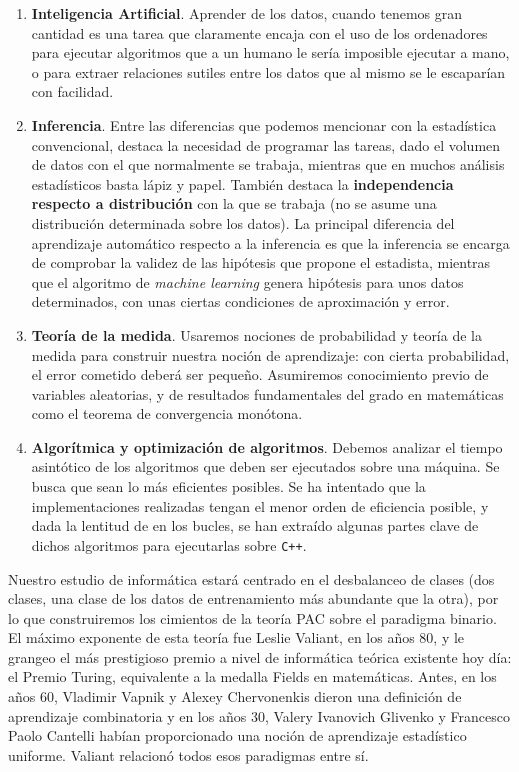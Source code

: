 \begin{enumerate}[i]
\item \textbf{Inteligencia Artificial}. Aprender de los datos, cuando tenemos gran cantidad es una tarea que 
claramente encaja con el uso de los ordenadores para ejecutar algoritmos que a un humano le sería imposible ejecutar a mano, o para
extraer relaciones sutiles entre los datos que al mismo se le escaparían con facilidad.

\item \textbf{Inferencia}. Entre las diferencias que podemos mencionar con la estadística convencional, destaca 
la necesidad de programar las tareas, dado el volumen de datos con el que normalmente se trabaja, mientras que en muchos análisis 
estadísticos basta lápiz y papel. También destaca la \textbf{independencia respecto a distribución} con la que se trabaja (no se
asume una distribución determinada sobre los datos). La principal diferencia del aprendizaje automático respecto a la inferencia 
es que la inferencia se encarga de comprobar la validez de las hipótesis que propone el estadista, mientras que el algoritmo de
\textit{machine learning} genera hipótesis para unos datos determinados, con unas ciertas condiciones de aproximación y error.

\item \textbf{Teoría de la medida}. Usaremos nociones de probabilidad y teoría de la medida para construir nuestra noción de 
aprendizaje: con cierta probabilidad, el error cometido deberá ser pequeño. Asumiremos conocimiento previo de variables 
aleatorias, y de resultados fundamentales del grado en matemáticas como el teorema de convergencia monótona.

\item \textbf{Algorítmica y optimización de algoritmos}. Debemos analizar el tiempo asintótico de los algoritmos que deben ser ejecutados
sobre una máquina. Se busca que sean lo más eficientes posibles. Se ha intentado que la implementaciones realizadas 
tengan el menor orden de eficiencia posible, y dada la lentitud de \R en los bucles, se han extraído algunas partes clave de dichos 
algoritmos para ejecutarlas sobre \texttt{C++}.
\end{enumerate}

Nuestro estudio de informática estará centrado en el desbalanceo de clases (dos clases, una clase de los datos de entrenamiento más 
abundante que la otra), por lo que construiremos los cimientos de la teoría PAC sobre el paradigma binario. El máximo exponente
de esta teoría fue Leslie Valiant, en los años 80, y le grangeo el más prestigioso premio a nivel de informática teórica
existente hoy día: el Premio Turing, equivalente a la medalla Fields en matemáticas. Antes, en los años 60, Vladimir Vapnik y 
Alexey Chervonenkis dieron una definición de aprendizaje combinatoria y en los años 30, Valery Ivanovich Glivenko y Francesco
Paolo Cantelli habían proporcionado una noción de aprendizaje estadístico uniforme. Valiant relacionó todos esos paradigmas
entre sí.

